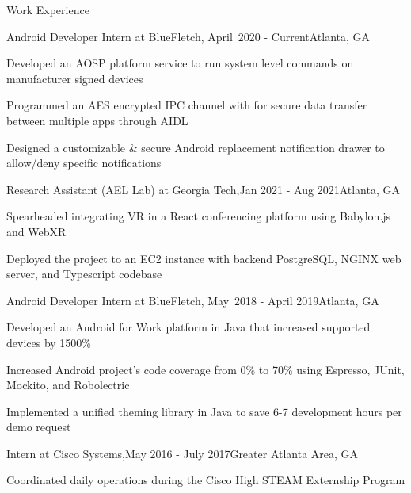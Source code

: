 \documentclass{resume} %
\begin{document}
\begin{rSection}{Work Experience}
	
	\begin{rSubsection}{Android Developer Intern at BlueFletch,}{ April~2020 - Current}{}{}{Atlanta, GA}
		\item Developed an AOSP platform service to run system level commands on manufacturer signed devices
		\item Programmed an AES encrypted IPC channel with for secure data transfer between multiple apps through AIDL
		\item Designed a customizable \& secure Android replacement notification drawer to allow/deny specific notifications
	\end{rSubsection} 
	
	\begin{rSubsection}{Research Assistant (AEL Lab) at Georgia Tech,}{Jan 2021 - Aug 2021}{}{}{Atlanta, GA}
		\item Spearheaded integrating VR in a React conferencing platform using Babylon.js and WebXR 
		\item Deployed the project to an EC2 instance with backend PostgreSQL, NGINX web server, and Typescript codebase
	\end{rSubsection} 

	\begin{rSubsection} {Android Developer Intern at BlueFletch,}{ May~2018 - April 2019}{}{}{Atlanta, GA}
	\item Developed an Android for Work platform in Java that increased supported devices by 1500\%
	\item Increased Android project's code coverage from 0\% to 70\% using Espresso, JUnit, Mockito, and Robolectric
	\item Implemented a unified theming library in Java to save 6-7 development hours per demo request
	
\end{rSubsection} 
	

\begin{rSubsection}{Intern at Cisco Systems,}{May 2016 - July 2017}{}{}{Greater Atlanta Area, GA}
	\item Coordinated daily operations during the Cisco High STEAM Externship Program
\end{rSubsection} 
\end{rSection} 
\end{document}
